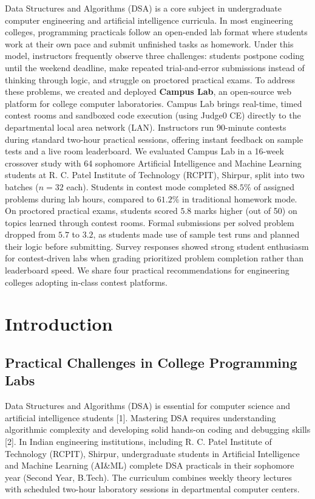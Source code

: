 \documentclass[12pt,a4paper]{article}
\begin{document}
Data Structures and Algorithms (DSA) is a core subject in undergraduate computer engineering and artificial intelligence curricula. In most engineering colleges, programming practicals follow an open-ended lab format where students work at their own pace and submit unfinished tasks as homework. Under this model, instructors frequently observe three challenges: students postpone coding until the weekend deadline, make repeated trial-and-error submissions instead of thinking through logic, and struggle on proctored practical exams. To address these problems, we created and deployed \textbf{Campus Lab}, an open-source web platform for college computer laboratories. Campus Lab brings real-time, timed contest rooms and sandboxed code execution (using Judge0 CE) directly to the departmental local area network (LAN). Instructors run 90-minute contests during standard two-hour practical sessions, offering instant feedback on sample tests and a live room leaderboard. We evaluated Campus Lab in a 16-week crossover study with 64 sophomore Artificial Intelligence and Machine Learning students at R. C. Patel Institute of Technology (RCPIT), Shirpur, split into two batches ($n = 32$ each). Students in contest mode completed $88.5\%$ of assigned problems during lab hours, compared to $61.2\%$ in traditional homework mode. On proctored practical exams, students scored $5.8$ marks higher (out of 50) on topics learned through contest rooms. Formal submissions per solved problem dropped from $5.7$ to $3.2$, as students made use of sample test runs and planned their logic before submitting. Survey responses showed strong student enthusiasm for contest-driven labs when grading prioritized problem completion rather than leaderboard speed. We share four practical recommendations for engineering colleges adopting in-class contest platforms.

\vspace{4pt}

\section{Introduction}
\label{sec:intro}

\subsection{Practical Challenges in College Programming Labs}
Data Structures and Algorithms (DSA) is essential for computer science and artificial intelligence students [1]. Mastering DSA requires understanding algorithmic complexity and developing solid hands-on coding and debugging skills [2]. In Indian engineering institutions, including R. C. Patel Institute of Technology (RCPIT), Shirpur, undergraduate students in Artificial Intelligence and Machine Learning (AI\&ML) complete DSA practicals in their sophomore year (Second Year, B.Tech). The curriculum combines weekly theory lectures with scheduled two-hour laboratory sessions in departmental computer centers.
\end{document}
